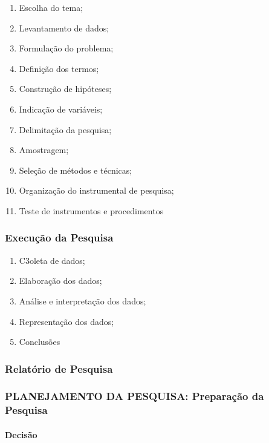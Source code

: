 \documentclass[
]{book}
\providecommand{\tightlist}{%
  \setlength{\itemsep}{0pt}\setlength{\parskip}{0pt}}
\begin{document}
\begin{enumerate}
\def\labelenumi{\arabic{enumi}.}
\tightlist
\item
  Escolha do tema;
\item
  Levantamento de dados;
\item
  Formulação do problema;
\item
  Definição dos termos;
\item
  Construção de hipóteses;
\item
  Indicação de variáveis;
\item
  Delimitação da pesquisa;
\item
  Amostragem;
\item
  Seleção de métodos e técnicas;
\item
  Organização do instrumental de pesquisa;
\item
  Teste de instrumentos e procedimentos
\end{enumerate}

\hypertarget{execuuxe7uxe3o-da-pesquisa}{%
\subsubsection{Execução da Pesquisa}\label{execuuxe7uxe3o-da-pesquisa}}

\begin{enumerate}
\def\labelenumi{\arabic{enumi}.}
\tightlist
\item
  C3oleta de dados;
\item
  Elaboração dos dados;
\item
  Análise e interpretação dos dados;
\item
  Representação dos dados;
\item
  Conclusões
\end{enumerate}

\hypertarget{relatuxf3rio-de-pesquisa}{%
\subsubsection{Relatório de Pesquisa}\label{relatuxf3rio-de-pesquisa}}

\hypertarget{planejamento-da-pesquisa-preparauxe7uxe3o-da-pesquisa}{%
\subsubsection{PLANEJAMENTO DA PESQUISA: Preparação da
Pesquisa}\label{planejamento-da-pesquisa-preparauxe7uxe3o-da-pesquisa}}

\hypertarget{decisuxe3o}{%
\paragraph{Decisão}\label{decisuxe3o}}
\end{document}
